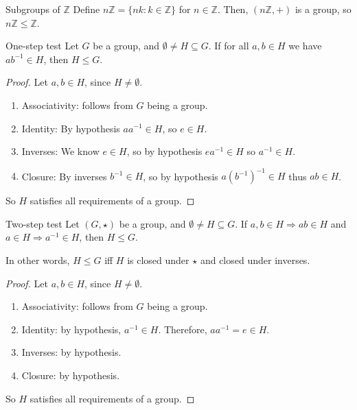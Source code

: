 \documentclass[12pt]{article}
\newcommand{\Z}{\mathbb{Z}}
\newcommand{\inv}{^{-1}}
\begin{document}
	\begin{myex}{Subgroups of $\Z$}{}
		Define $n\Z=\{nk:k\in\Z\}$ for $n\in\Z$. Then, $(n\Z, +)$ is a group, so $n\Z\leq\Z$.
	\end{myex}
	
	\begin{myprop}{One-step test}{}
		Let $G$ be a group, and $\emptyset\neq H\subseteq G$. If for all $a, b\in H$ we have $ab\inv\in H$, then $H\leq G$.
		\begin{proof}
			Let $a, b\in H$, since $H\neq\emptyset$.
			\begin{enumerate}[label=(\roman*)]
				\item Associativity: follows from $G$ being a group.
				\item Identity: By hypothesis $aa\inv\in H$, so $e\in H$.
				\item Inverses: We know $e\in H$, so by hypothesis $ea\inv\in H$ so $a\inv\in H$.
				\item Closure: By inverses $b\inv\in H$, so by hypothesis $a(b\inv)\inv\in H$ thus $ab\in H$.
			\end{enumerate}
			So $H$ satisfies all requirements of a group.
		\end{proof}
	\end{myprop}
	
	\begin{myprop}{Two-step test}{}
		Let $(G, \star)$ be a group, and $\emptyset\neq H\subseteq G$. If $a, b\in H\Longrightarrow ab\in H$ and $a\in H\Longrightarrow a\inv\in H$, then $H\leq G$.
		
		In other words, $H\leq G$ iff $H$ is closed under $\star$ and closed under inverses.
		\begin{proof}
			Let $a, b\in H$, since $H\neq\emptyset$.
			\begin{enumerate}[label=(\roman*)]
				\item Associativity: follows from $G$ being a group.
				\item Identity: by hypothesis, $a\inv\in H$. Therefore, $aa\inv=e\in H$.
				\item Inverses: by hypothesis.
				\item Closure: by hypothesis.
			\end{enumerate}
			So $H$ satisfies all requirements of a group.
		\end{proof}
	\end{myprop}
	
\end{document}
